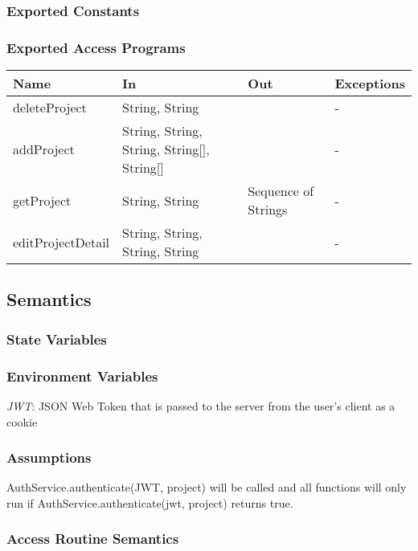 \documentclass[12pt, titlepage]{article}
\begin{document}
	\subsubsection{Exported Constants}
	
	\subsubsection{Exported Access Programs}
	
	\footnotesize\begin{center}
		\begin{tabular}{l l l l}
			\hline
			\textbf{Name} & \textbf{In} & \textbf{Out} & \textbf{Exceptions} \\
			\hline
			deleteProject & String, String &  & - \\
			\hline
			addProject & String, String, String, String[], String[] &  & - \\
			\hline
			getProject & String, String & Sequence of Strings & - \\
			\hline
			editProjectDetail & String, String, String, String &  & - \\
			\hline
		\end{tabular}
	\end{center}
	\normalsize
	\subsection{Semantics}
	
	\subsubsection{State Variables}
	
	
	\subsubsection{Environment Variables}
	\noindent \textit{JWT}: JSON Web Token that is passed to the server from the user's client as a cookie
	
	\subsubsection{Assumptions}
	AuthService.authenticate(JWT, project) will be called and all functions will only run if AuthService.authenticate(jwt, project) returns true.
	
	\subsubsection{Access Routine Semantics}
	
\end{document}
